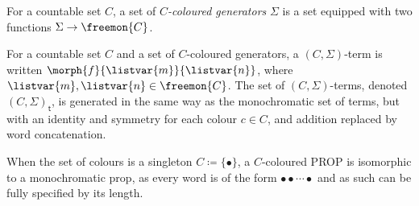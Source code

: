 \begin{definition}
    For a countable set \(C\), a set of \emph{\(C\)-coloured generators}
    \(\Sigma\) is a set equipped with two functions \(\Sigma \to \freemon{C}\).
\end{definition}

\begin{definition}
    For a countable set \(C\) and a set of \(C\)-coloured generators, a
    \((C,\Sigma)\)-term is written \(\morph{f}{\listvar{m}}{\listvar{n}}\),
    where \(\listvar{m},\listvar{n} \in \freemon{C}\).
    The set of \((C,\Sigma)\)-terms, denoted \((C,\Sigma)_\mathsf{t}\), is
    generated in the same way as the monochromatic set of terms, but with an
    identity and symmetry for each colour \(c \in C\), and addition replaced by
    word concatenation.
\end{definition}

\begin{remark}
    When the set of colours is a singleton \(C \coloneqq \{\bullet\}\), a
    \(C\)-coloured PROP is isomorphic to a monochromatic prop, as every word is
    of the form \(\bullet\bullet\cdots\bullet\) and as such can be fully
    specified by its length.
\end{remark}